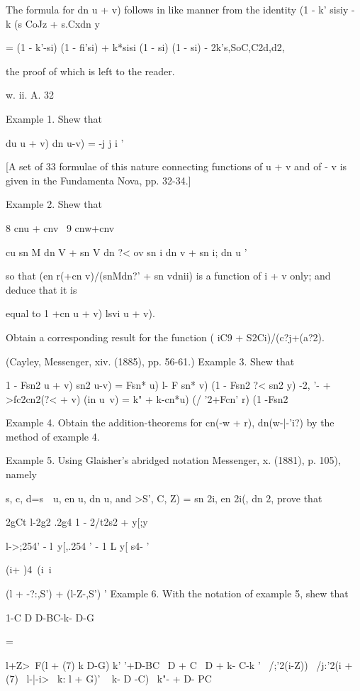 The formula for dn u + v) follows in like manner from the identity (1
- k' sisiy - k (s CoJz + s.Cxdn y

= (1 - k'-si) (1 - fi'si) + k*sisi (1 - si) (1 - si) -
2k's,SoC,C2d,d2,

the proof of which is left to the reader.

w. ii. A. 32

%
%

Example 1. Shew that

du u + v) dn u-v) = -j j i ' 

 [A set of 33 formulae of this nature connecting functions of
u + v and of - v is given in the Fundamenta Nova, pp. 32-34.]

Example 2. Shew that

8 cnu + cnv \ 9 cnw+cnv

cu sn M dn V + sn V dn ?< ov sn i dn v + sn i; dn u '

so that (en r(+cn v)/(snMdn?' + sn vdnii) is a function of i + v only;
and deduce that it is

equal to 1 +cn u + v) lsvi u + v).

Obtain a corresponding result for the function ( iC9 +
S2Ci)/(c?j+(a?2).

(Cayley, Messenger, xiv. (1885), pp. 56-61.) Example 3. Shew that

1 - Fsn2 u + v) sn2 u-v) = Fsn* u) l- F sn* v) (1 - Fsn2 ?< sn2 y) -2,
'- + >fc2cn2(?< + v) (in u~v) = k" + k-cn*u) (/ '2+Fcn' r) (1
-Fsn2%


Example 4. Obtain the addition-theorems for cn(-w + r), dn(w-|-'i?) by
the method of example 4.

Example 5. Using Glaisher's abridged notation Messenger, x. (1881), p.
105), namely

s, c, d=s\ \ u, en u, dn u, and >S', C, Z) = sn 2i, en 2i(, dn 2,
prove that

2gCt l-2g2 .2g4 1 - 2/t2s2 + y[;y

l->;254' - l\ y[,.254 ' - 1 L y[ s4- '

(i+ )4\ (i\ i

(l + -?:,S') + (l-Z-,S') ' Example 6. With the notation of example 5,
shew that

1-C D D-BC-k- D-G

   =

l+Z>~F(l + (7) k D-G) k' '+D-BC \ D + C \ D + k- C-k ' \ /;'2(i-Z)) \
/j:'2(i + (7) ~l-|-i>~ k: l + G)' ~ k- D -C)~ k"- + D- PC

